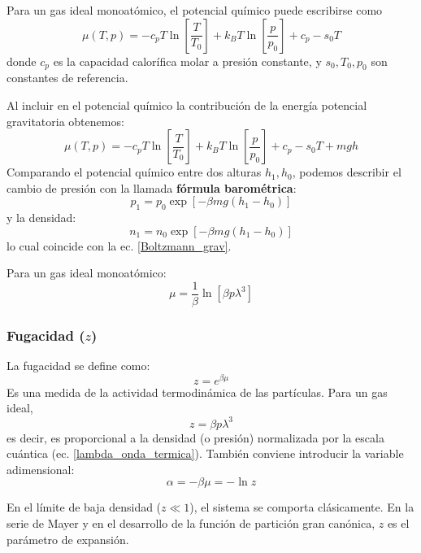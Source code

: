 \documentclass[]{article}
\numberwithin{equation}{section}
\newcommand{\0}{\textcolor{gray}{0}}
\begin{document}
Para un gas ideal monoatómico, el potencial químico puede escribirse como
\begin{equation}
	\mu(T,p) = -c_p T \ln\left[\frac{T}{T_0}\right] + k_B T \ln\left[\frac{p}{p_0}\right] + c_p - s_0 T
\end{equation}
donde \(c_p\) es la capacidad calorífica molar a presión constante, y \(s_0, T_0, p_0\) son constantes de referencia.

Al incluir en el potencial químico la contribución de la energía potencial gravitatoria obtenemos:
\begin{equation}
	\mu(T,p) = -c_p T \ln\left[\frac{T}{T_0}\right] + k_B T \ln\left[\frac{p}{p_0}\right] + c_p - s_0 T + m g h
\end{equation}
Comparando el potencial químico entre dos alturas \(h_1, h_0\), podemos describir el cambio de presión con la llamada \textbf{fórmula barométrica}:
\begin{equation}
	p_1 = p_0 \exp\left[-\beta m g (h_1 - h_0)\right]
\end{equation}
y la densidad:
\begin{equation*}
	n_1 = n_0 \exp\left[-\beta m g (h_1 - h_0)\right]
\end{equation*}
lo cual coincide con la ec. \ref{Boltzmann_grav}.

Para un gas ideal monoatómico:
\begin{equation}
	\mu = \frac{1}{\beta} \ln\left[\beta p \lambda^3\right]
\end{equation}

\subsubsection{Fugacidad (\(z\))}
La fugacidad se define como:
\begin{equation}
	z = e^{\beta \mu}
\end{equation}
Es una medida de la actividad termodinámica de las partículas. Para un gas ideal,
\begin{equation}
	z = \beta p \lambda^3
\end{equation}
es decir, es proporcional a la densidad (o presión) normalizada por la escala cuántica (ec. \ref{lambda_onda_termica}). También conviene introducir la variable adimensional:
\begin{equation}
	\alpha = -\beta\mu = - \ln z \label{alpha}
\end{equation}

En el límite de baja densidad (\(z \ll 1\)), el sistema se comporta clásicamente. En la serie de Mayer y en el desarrollo de la función de partición gran canónica, \(z\) es el parámetro de expansión.
\end{document}
